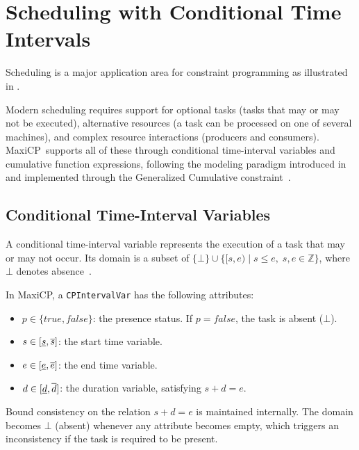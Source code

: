 \documentclass[11pt, a4paper]{scrartcl}
\newcommand{\maxicp}{\textsf{MaxiCP}}
\begin{document}
\section{Scheduling with Conditional Time Intervals}
\label{sec:scheduling}

Scheduling is a major application area for constraint programming as illustrated in \cite{laborie2018ibm}.

Modern scheduling requires support for optional tasks (tasks that may or may not be executed),
alternative resources (a task can be processed on one of several machines), and complex resource interactions (producers and consumers).
\maxicp\ supports all of these through conditional time-interval variables and cumulative function expressions,
following the modeling paradigm introduced in~\cite{LaborieRSV09} and implemented through the Generalized Cumulative constraint~\cite{Schaus2025GeneralizedCumulative}.

\subsection{Conditional Time-Interval Variables}

A conditional time-interval variable represents the execution of a task that may or may not occur. Its domain is a subset of $\{\bot\} \cup \{[s, e) \mid s \leq e,\; s, e \in \mathbb{Z}\}$, where $\bot$ denotes absence~\cite{LaborieR08}.

In \maxicp, a \texttt{CPIntervalVar} has the following attributes:
\begin{itemize}
    \item $p \in \{\mathit{true}, \mathit{false}\}$: the presence status. If $p = \mathit{false}$, the task is absent ($\bot$).
    \item $s \in [\underline{s}, \overline{s}]$: the start time variable.
    \item $e \in [\underline{e}, \overline{e}]$: the end time variable.
    \item $d \in [\underline{d}, \overline{d}]$: the duration variable, satisfying $s + d = e$.
\end{itemize}

Bound consistency on the relation $s + d = e$ is maintained internally. The domain becomes $\bot$ (absent) whenever any attribute becomes empty, which triggers an inconsistency if the task is required to be present.
\end{document}
